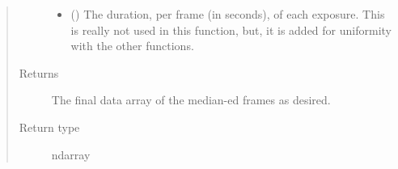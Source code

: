 \documentclass[letterpaper,10pt,english]{sphinxmanual}
\begin{document}
\begin{fulllineitems}
\begin{quote}
\begin{description}
\begin{itemize}
\item {} 
 () \textendash{} The duration, per frame (in seconds), of each exposure. This is
really not used in this function, but, it is added for uniformity with
the other functions.

\end{itemize}

\item[{Returns}] \leavevmode
{} \textendash{} The final data array of the median-ed frames as desired.

\item[{Return type}] \leavevmode
ndarray

\end{description}\end{quote}

\end{fulllineitems}

\end{document}

